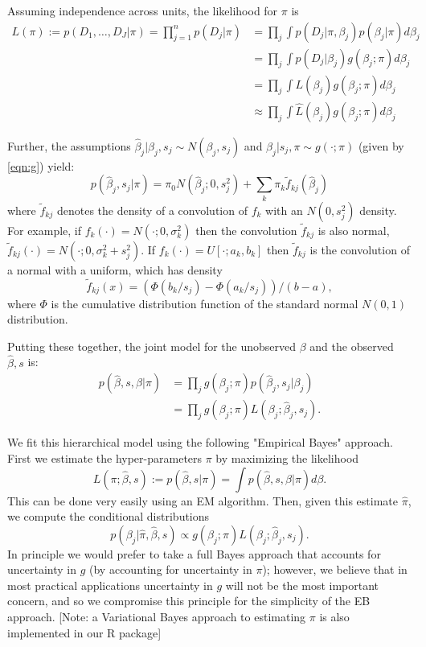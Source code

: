 \documentclass[11pt]{article}
\begin{document}
Assuming independence across units, the likelihood for $\pi$ is 
\begin{align}
L(\pi) := p(D_1,\dots,D_J | \pi) = \prod_{j=1}^n p(D_j | \pi)
& = \prod_j \int p(D_j | \pi, \beta_j) p(\beta_j | \pi) d\beta_j \\
& = \prod_j \int p(D_j | \beta_j) g(\beta_j; \pi) d\beta_j \\
& = \prod_j \int L(\beta_j) g(\beta_j; \pi) d\beta_j \\
& \approx \prod_j \int \hat{L}(\beta_j) g(\beta_j; \pi) d\beta_j
\end{align}

Further, the assumptions  $\hat\beta_j | \beta_j, s_j \sim N(\beta_j,s_j)$ and $\beta_j | s_j, \pi \sim g(\cdot; \pi)$ (given by \ref{eqn:g}) yield: 
\begin{equation}
p(\hat\beta_j, s_j | \pi) = \pi_0 N(\hat\beta_j; 0,s^2_j) + \sum_k \pi_k \tilde{f}_{kj}(\hat\beta_j)
\end{equation}
where $\tilde{f}_{kj}$ denotes the density of a convolution of $f_k$ with an $N(0,s^2_j)$ density.
For example, if $f_k(\cdot) = N(\cdot; 0,\sigma^2_k)$ then the convolution $\tilde{f}_{kj}$ is also normal, $\tilde{f}_{kj}(\cdot) = N(\cdot; 0,\sigma^2_k + s^2_j)$. If
$f_k(\cdot) = U[\cdot; a_k,b_k]$ then $\tilde{f}_{kj}$ is the convolution of a normal with a uniform, which has density
\begin{equation}
\tilde{f}_{kj}(x) = (\Phi(b_k/s_j) - \Phi(a_k/s_j))/(b-a),
\end{equation}
where $\Phi$ is the cumulative distribution function of the standard normal $N(0,1)$ distribution.

Putting these together, the joint model for the unobserved $\beta$ and the observed $\hat\beta, s$ is:
\begin{align}
p(\hat\beta, s, \beta | \pi) & = \prod_j g(\beta_j ; \pi) p(\hat\beta_j, s_j | \beta_j) \\
& = \prod_j g(\beta_j ; \pi) L(\beta_j; \hat\beta_j,s_j).
\end{align}

We fit this hierarchical model using the following "Empirical Bayes" approach. First we estimate the hyper-parameters $\pi$ by maximizing the likelihood
\begin{equation}
L(\pi; \hat\beta, s) := p(\hat\beta, s | \pi) = \int p(\hat\beta, s, \beta | \pi) d\beta.
\end{equation}
This can be done very easily using an EM algorithm.
Then, given this estimate $\hat\pi$, we compute the conditional distributions 
\begin{equation}
p(\beta_j | \hat\pi, \hat\beta, s) \propto g(\beta_j; \pi) L(\beta_j; \hat\beta_j, s_j).
\end{equation} 
In principle we would
prefer to take a full Bayes approach that accounts for uncertainty in $g$ (by accounting for uncertainty in $\pi$); however,
we believe that in most practical applications uncertainty in $g$ will not be the most important concern, and so 
we compromise this principle for the simplicity of the EB approach.
[Note: a Variational Bayes approach to estimating $\pi$ is also implemented in our R package]
\end{document}
